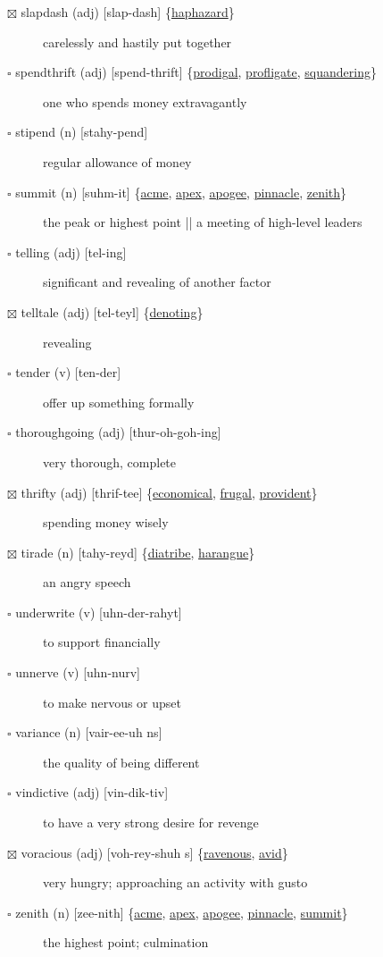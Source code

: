 \documentclass[11pt]{article}
\begin{document}
\begin{description}
\item[{$\boxtimes$ \label{orgbe36a91}slapdash (adj) [slap-dash] \{\hyperref[org26e7d3a]{haphazard}\}}] carelessly and hastily put together
\item[{$\square$ \label{org4fffebe}spendthrift (adj) [spend-thrift] \{\hyperref[orgf465044]{prodigal}, \hyperref[orgc71b43a]{profligate}, \hyperref[org5668651]{squandering}\}}] one who spends money extravagantly
\item[{$\square$ stipend (n) [stahy-pend]}] regular allowance of money
\item[{$\square$ \label{org9cb55e7}summit (n) [suhm-it] \{\hyperref[orgcd04c21]{acme}, \hyperref[org6b46e9e]{apex}, \hyperref[orge7e78f1]{apogee}, \hyperref[orgc8167b5]{pinnacle}, \hyperref[org79910cc]{zenith}\}}] the peak or highest point || a meeting of high-level leaders
\item[{$\square$ telling (adj) [tel-ing]}] significant and revealing of another factor
\item[{$\boxtimes$ \label{orgab742a0}telltale (adj) [tel-teyl] \{\hyperref[org9f275c9]{denoting}\}}] revealing
\item[{$\square$ tender (v) [ten-der]}] offer up something formally
\item[{$\square$ thoroughgoing (adj) [thur-oh-goh-ing]}] very thorough, complete
\item[{$\boxtimes$ \label{org7c1d566}thrifty (adj) [thrif-tee] \{\hyperref[orgcae06d1]{economical}, \hyperref[org0d99c47]{frugal}, \hyperref[org6590548]{provident}\}}] spending money wisely
\item[{$\boxtimes$ \label{org6667745}tirade (n) [tahy-reyd] \{\hyperref[orgdfe7602]{diatribe}, \hyperref[org045aced]{harangue}\}}] an angry speech
\item[{$\square$ underwrite (v) [uhn-der-rahyt]}] to support financially
\item[{$\square$ unnerve (v) [uhn-nurv]}] to make nervous or upset
\item[{$\square$ variance (n) [vair-ee-uh ns]}] the quality of being different
\item[{$\square$ vindictive (adj) [vin-dik-tiv]}] to have a very strong desire for revenge
\item[{$\boxtimes$ \label{org96629dc}voracious (adj) [voh-rey-shuh s] \{\hyperref[orgf195d90]{ravenous}, \hyperref[org671f6ae]{avid}\}}] very hungry; approaching an activity with gusto
\item[{$\square$ \label{org79910cc}zenith (n) [zee-nith] \{\hyperref[orgcd04c21]{acme}, \hyperref[org6b46e9e]{apex}, \hyperref[orge7e78f1]{apogee}, \hyperref[orgc8167b5]{pinnacle}, \hyperref[org9cb55e7]{summit}\}}] the highest point; culmination
\end{description}
\end{document}
